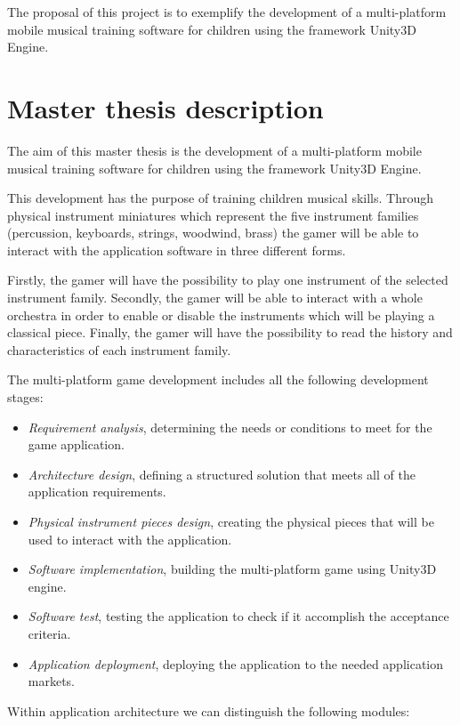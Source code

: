 The proposal of this project is to exemplify the development of a multi-platform mobile musical training software for children using the framework Unity3D Engine.

\section{Master thesis description}

The aim of this master thesis is the development of a multi-platform mobile musical training software for children using the framework Unity3D Engine.

This development has the purpose of training children musical skills. Through physical instrument miniatures which represent the five instrument families (percussion, keyboards, strings, woodwind, brass) the gamer will be able to interact with the application software in three different forms.

Firstly, the gamer will have the possibility to play one instrument of the selected instrument family. Secondly, the gamer will be able to interact with a whole orchestra in order to enable or disable the instruments which will be playing a classical piece. Finally, the gamer will have the possibility to read the history and characteristics of each instrument family.

The multi-platform game development includes all the following development stages:
\begin{itemize}
\item \textit{Requirement analysis}, determining the needs or conditions to meet for the game application.
\item \textit{Architecture design}, defining a structured solution that meets all of the application requirements.
\item \textit{Physical instrument pieces design}, creating the physical pieces that will be used to interact with the application.
\item \textit{Software implementation}, building the multi-platform game using Unity3D engine.
\item \textit{Software test}, testing the application to check if it accomplish the acceptance criteria.
\item \textit{Application deployment}, deploying the application to the needed application markets.
\end{itemize}

Within application architecture we can distinguish the following modules:

